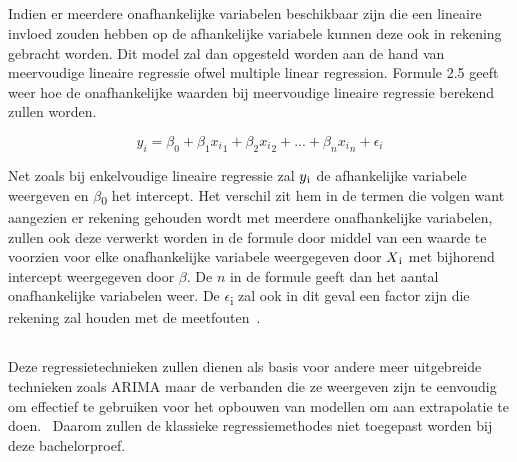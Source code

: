 \subsection{}

Indien er meerdere onafhankelijke variabelen beschikbaar zijn die een lineaire invloed zouden hebben op de afhankelijke variabele kunnen deze ook in rekening gebracht worden. Dit model zal dan opgesteld worden aan de hand van meervoudige lineaire regressie ofwel multiple linear regression. Formule 2.5 geeft weer hoe de onafhankelijke waarden bij meervoudige lineaire regressie berekend zullen worden.

\begin{equation}
y_i = \beta_0 + \beta_1 {x_i}_1 + \beta_2 {x_i}_2 + ... + \beta_n {x_i}_n + \epsilon_i
\end{equation}

Net zoals bij enkelvoudige lineaire regressie zal $y\textsubscript{i}$ de afhankelijke variabele weergeven en $\beta$\textsubscript{0} het intercept. Het verschil zit hem in de termen die volgen want aangezien er rekening gehouden wordt met meerdere onafhankelijke variabelen, zullen ook deze verwerkt worden in de formule door middel van een waarde te voorzien voor elke onafhankelijke variabele weergegeven door $X\textsubscript{i}$ met bijhorend intercept weergegeven door $\beta$. De $n$ in de formule geeft dan het aantal onafhankelijke variabelen weer. De $\epsilon$\textsubscript{i} zal ook in dit geval een factor zijn die rekening zal houden met de meetfouten~\autocite{Kenton2020}.

\subsection{}

Deze regressietechnieken zullen dienen als basis voor andere meer uitgebreide technieken zoals ARIMA maar de verbanden die ze weergeven zijn te eenvoudig om effectief te gebruiken voor het opbouwen van modellen om aan extrapolatie te doen.~\autocite{Sinha2019} Daarom zullen de klassieke regressiemethodes niet toegepast worden bij deze bachelorproef. 


